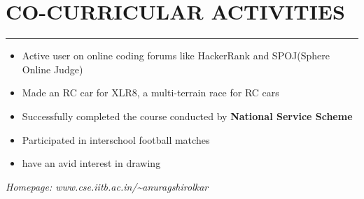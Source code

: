 \message{ !name(resume2.tex)}\documentclass[11pt]{book} %
\begin{document}
\section*{CO-CURRICULAR ACTIVITIES}
\hrule
\medskip
\vspace{2mm}
\begin{itemize}
\itemsep-0.0em
\item Active user on online coding forums like HackerRank and SPOJ(Sphere Online Judge)
\item Made an RC car for XLR8, a multi-terrain race for RC cars
\item Successfully completed the course conducted by \textbf{National Service Scheme}
\item Participated in interschool football matches
\item have an avid interest in drawing
\end{itemize}
\vfill
\textit{Homepage: www.cse.iitb.ac.in/\textasciitilde anuragshirolkar}
\end{document}
